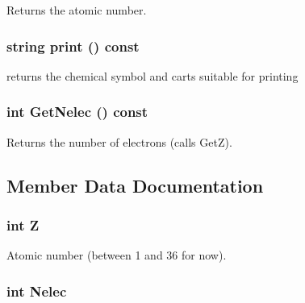 Returns the atomic number. \hypertarget{classJKBuilder_1_1atom_a41d45f22912b0c077a76b7a4234599b6}{
\subsubsection[{print}]{\setlength{\rightskip}{0pt plus 5cm}string print () const}}
\label{classJKBuilder_1_1atom_a41d45f22912b0c077a76b7a4234599b6}


returns the chemical symbol and carts suitable for printing \hypertarget{classJKBuilder_1_1atom_aeb29d9144c99d302f7b43d5398929ea5}{
\subsubsection[{GetNelec}]{\setlength{\rightskip}{0pt plus 5cm}int GetNelec () const}}
\label{classJKBuilder_1_1atom_aeb29d9144c99d302f7b43d5398929ea5}


Returns the number of electrons (calls GetZ). 

\subsection{Member Data Documentation}
\hypertarget{classJKBuilder_1_1atom_a5ed5bfe6933ed8cba853237650cc041b}{
\subsubsection[{Z}]{\setlength{\rightskip}{0pt plus 5cm}int {\bf Z}}}
\label{classJKBuilder_1_1atom_a5ed5bfe6933ed8cba853237650cc041b}


Atomic number (between 1 and 36 for now). \hypertarget{classJKBuilder_1_1atom_a849e4a1d5fee0c024e42b658d3babd02}{
\subsubsection[{Nelec}]{\setlength{\rightskip}{0pt plus 5cm}int {\bf Nelec}}}
\label{classJKBuilder_1_1atom_a849e4a1d5fee0c024e42b658d3babd02}


